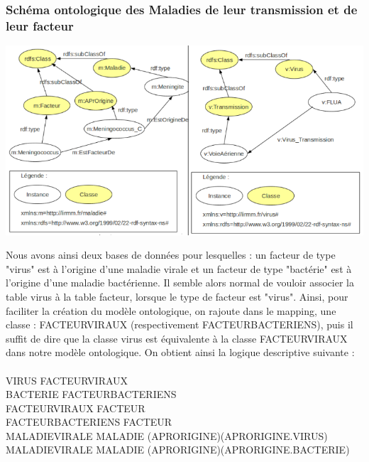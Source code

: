 \documentclass[12pt]{article}
\begin{document}
\subsubsection{Schéma ontologique des Maladies de leur transmission et de leur facteur}

\begin{center}
	\includegraphics[scale=0.60]{images/rdf-maladie+virus.png}
\end{center}

\indent Nous avons ainsi deux bases de données pour lesquelles : un facteur de type "virus" est à l'origine d'une maladie virale et un facteur de type "bactérie" est à l'origine d'une maladie bactérienne. Il semble alors normal de vouloir associer la table virus à la table facteur, lorsque le type de facteur est "virus". Ainsi, pour faciliter la création du modèle ontologique, on rajoute dans le mapping, une classe : FACTEURVIRAUX (respectivement FACTEURBACTERIENS), puis il suffit de dire que la classe virus est équivalente à la classe FACTEURVIRAUX dans notre modèle ontologique. On obtient ainsi la logique descriptive suivante : 
\\
\\
	VIRUS \subseteq FACTEURVIRAUX \\
	BACTERIE \subseteq FACTEURBACTERIENS \\
	FACTEURVIRAUX \subseteq FACTEUR \\
	FACTEURBACTERIENS \subseteq FACTEUR \\ 
	MALADIEVIRALE \subseteq MALADIE \cap (\geq APRORIGINE)(\exists APRORIGINE.VIRUS) \\
 	MALADIEVIRALE \subseteq MALADIE \cap (\geq APRORIGINE)(\exists APRORIGINE.BACTERIE) \\
\end{document}

